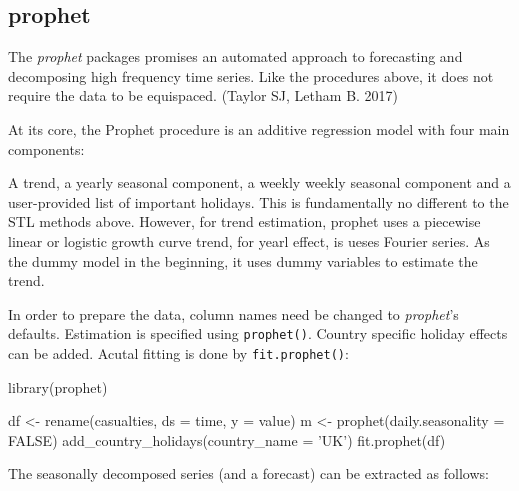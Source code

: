 \hypertarget{prophet}{%
\subsection{prophet}\label{prophet}}

The \emph{prophet} packages promises an automated approach to
forecasting and decomposing high frequency time series. Like the
procedures above, it does not require the data to be equispaced. (Taylor
SJ, Letham B. 2017)

At its core, the Prophet procedure is an additive regression model with
four main components:

A trend, a yearly seasonal component, a weekly weekly seasonal component
and a user-provided list of important holidays. This is fundamentally no
different to the STL methods above. However, for trend estimation,
prophet uses a piecewise linear or logistic growth curve trend, for
yearl effect, is ueses Fourier series. As the dummy model in the
beginning, it uses dummy variables to estimate the trend.

In order to prepare the data, column names need be changed to
\emph{prophet}'s defaults. Estimation is specified using
\texttt{prophet()}. Country specific holiday effects can be added.
Acutal fitting is done by \texttt{fit.prophet()}:

\begin{Schunk}
\begin{Sinput}
library(prophet)

df <- rename(casualties, ds = time, y = value)
m <-
  prophet(daily.seasonality = FALSE) %
  add_country_holidays(country_name = 'UK') %
  fit.prophet(df)
\end{Sinput}
\end{Schunk}

The seasonally decomposed series (and a forecast) can be extracted as
follows:

